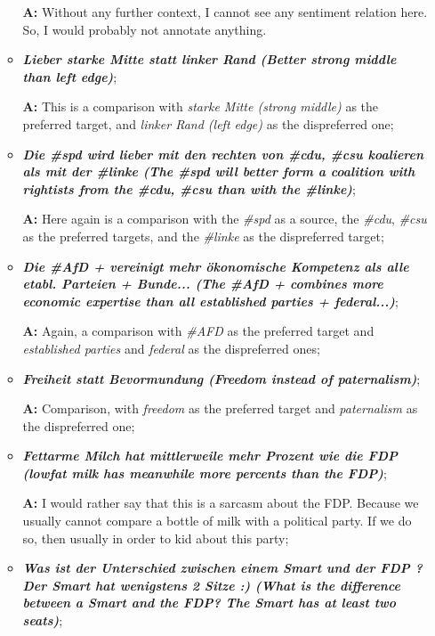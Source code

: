 \documentclass[11pt,a4paper]{article}
\theoremstyle{mytheoremstyle}
\begin{document}
\begin{enumerate}
\begin{itemize}
    \textbf{A:} Without any further context, I cannot see any
    sentiment relation here.  So, I would probably not annotate
    anything.

  \item\textbf{\textit{Lieber starke Mitte statt linker Rand (Better
      strong middle than left edge)}};

    \textbf{A:} This is a comparison with \textit{starke Mitte (strong
      middle)} as the preferred target, and \textit{linker Rand (left
      edge)} as the dispreferred one;

  \item\textbf{\textit{Die \#spd wird lieber mit den rechten von
      \#cdu, \#csu koalieren als mit der \#linke (The \#spd will
      better form a coalition with rightists from the \#cdu, \#csu
      than with the \#linke)}};

    \textbf{A:} Here again is a comparison with the \textit{\#spd} as
    a source, the \textit{\#cdu}, \textit{\#csu} as the preferred
    targets, and the \textit{\#linke} as the dispreferred target;

  \item\textbf{\textit{Die \#AfD + vereinigt mehr \"okonomische
      Kompetenz als alle etabl. Parteien + Bunde... (The \#AfD +
      combines more economic expertise than all established parties +
      federal...)}};

    \textbf{A:} Again, a comparison with \textit{\#AFD} as the
    preferred target and \textit{established parties} and
    \textit{federal} as the dispreferred ones;

  \item\textbf{\textit{Freiheit statt Bevormundung (Freedom instead of
      paternalism)}};

    \textbf{A:} Comparison, with \textit{freedom} as the preferred
    target and \textit{paternalism} as the dispreferred one;

  \item\textbf{\textit{Fettarme Milch hat mittlerweile mehr Prozent
      wie die FDP (lowfat milk has meanwhile more percents than the
      FDP)}};

    \textbf{A:} I would rather say that this is a sarcasm about the
    FDP.  Because we usually cannot compare a bottle of milk with a
    political party.  If we do so, then usually in order to kid about
    this party;

  \item\textbf{\textit{Was ist der Unterschied zwischen einem Smart
      und der FDP ? Der Smart hat wenigstens 2 Sitze :) (What is the
      difference between a Smart and the FDP? The Smart has at least
      two seats)}};


\end{itemize}
\end{enumerate}
\end{document}
